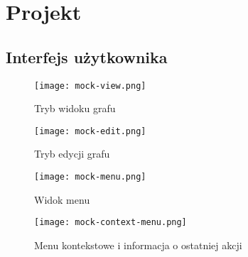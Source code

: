 \chapter{Projekt}
\section{Interfejs użytkownika}

\begin{figure}[H]
\caption{Tryb widoku grafu}
\centering
\texttt{[image: mock-view.png]}
\end{figure}

\begin{figure}[H]
\caption{Tryb edycji grafu}
\centering
\texttt{[image: mock-edit.png]}
\end{figure}

\begin{figure}[H]
\caption{Widok menu}
\centering
\texttt{[image: mock-menu.png]}
\end{figure}

\begin{figure}[H]
\caption{Menu kontekstowe i informacja o ostatniej akcji}
\centering
\texttt{[image: mock-context-menu.png]}
\end{figure}